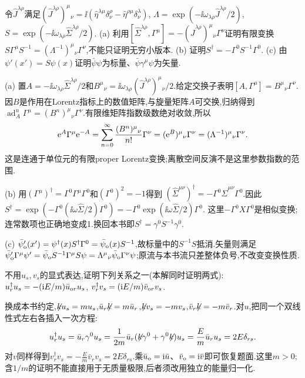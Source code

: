 \begin{exercise}
令$\widehat J^{\lambda\rho}$满足$(\widehat J^{\lambda\rho})^\mu{}_{\nu}=\ii(\widehat\eta^{\lambda\mu}\delta^\rho_\nu-\widehat\eta^{\rho\mu}\delta^\lambda_\nu)$,
$\Lambda=\exp(-\ii\omega_{\lambda\rho}\widehat J^{\lambda\rho}/2)$,$S=\exp(-\ii\omega_{\lambda\rho}\widehat\Sigma^{\lambda\rho}/2)$.
(a) 利用$[\widehat\Sigma^{\lambda\rho},\Gamma^\mu]=-(\widehat J^{\lambda\rho})^\mu{}_{\nu}\Gamma^\nu$证明有限变换$S\Gamma^\mu S^{-1}=(\Lambda^{-1})^\mu{}_{\nu}\Gamma^\nu$,不能只证明无穷小版本.
(b) 证明$S^\dagger=-\Gamma^0S^{-1}\Gamma^0$.
(c) 由$\psi'(x')=S\psi(x)$证明$\bar\psi\psi$为标量、$\bar\psi\gamma^\mu\psi$为矢量.
\end{exercise}
\begin{solution}
(a) 置$A=-\ii\omega_{\lambda\rho}\widehat\Sigma^{\lambda\rho}/2$和$B^\mu{}_{\nu}=\ii\omega_{\lambda\rho}(\widehat J^{\lambda\rho})^\mu{}_{\nu}/2$.给定交换子表明$[A,\Gamma^\mu]=B^\mu{}_{\nu}\Gamma^\nu$.因$B$是作用在Lorentz指标上的数值矩阵,与旋量矩阵$A$可交换,归纳得到
$\operatorname{ad}_A^n\Gamma^\mu=(B^n)^\mu{}_{\nu}\Gamma^\nu$.有限维矩阵指数级数绝对收敛,所以
\[
 \e^A\Gamma^\mu\e^{-A}=\sum_{n=0}^\infty\frac{(B^n)^\mu{}_{\nu}}{n!}\Gamma^\nu
 =(\e^B)^\mu{}_{\nu}\Gamma^\nu=(\Lambda^{-1})^\mu{}_{\nu}\Gamma^\nu.
\]
这是连通于单位元的有限proper Lorentz变换;离散空间反演不是这里参数指数的范围.

(b) 用$(\Gamma^\mu)^\dagger=\Gamma^0\Gamma^\mu\Gamma^0$和$(\Gamma^0)^2=-1$得到
$(\widehat\Sigma^{\mu\nu})^\dagger=-\Gamma^0\widehat\Sigma^{\mu\nu}\Gamma^0$.因此
$S^\dagger=\exp(-\Gamma^0(\ii\omega\widehat\Sigma/2)\Gamma^0)=-\Gamma^0\exp(\ii\omega\widehat\Sigma/2)\Gamma^0$.
这里$-\Gamma^0X\Gamma^0$是相似变换;连常数项也正确地变成1.换回本书即$S^\dagger=\gamma^0S^{-1}\gamma^0$.

(c) $\bar\psi'_{\rm o}(x')=\psi^\dagger(x)S^\dagger\Gamma^0=\bar\psi_{\rm o}(x)S^{-1}$,故标量中的$S^{-1}S$抵消.矢量则满足
$\bar\psi'_{\rm o}\Gamma^\mu\psi'=\bar\psi_{\rm o}S^{-1}\Gamma^\mu S\psi=\Lambda^\mu{}_{\nu}\bar\psi_{\rm o}\Gamma^\nu\psi$;原流与本书流只差整体负号,不改变变换性质.
\end{solution}

\begin{exercise}
不用$u_s,v_s$的显式表达,证明下列关系之一(本解同时证明两式):
$u_r^\dagger u_s=-(\ii E/m)\bar u_{{\rm o}r}u_s$,
$v_r^\dagger v_s=(\ii E/m)\bar v_{{\rm o}r}v_s$.
\end{exercise}
\begin{solution}
换成本书约定,$\slashed k u_s=mu_s$,$\bar u_r\slashed k=m\bar u_r$,$\slashed k v_s=-mv_s$,$\bar v_r\slashed k=-m\bar v_r$.对$u$,把同一个双线性式左右各插入一次方程:
\[
 u_r^\dagger u_s=\bar u_r\gamma^0u_s
 =\frac1{2m}\bar u_r(\slashed k\gamma^0+\gamma^0\slashed k)u_s
 =\frac{E}{m}\bar u_ru_s=2E\delta_{rs}.
\]
对$v$同样得到$v_r^\dagger v_s=-\frac{E}{m}\bar v_rv_s=2E\delta_{rs}$.乘$\bar u_{\rm o}=\ii\bar u$、$\bar v_{\rm o}=\ii\bar v$即可恢复题面.这里$m>0$;含$1/m$的证明不能直接用于无质量极限,后者须改用独立的能量归一化.
\end{solution}

